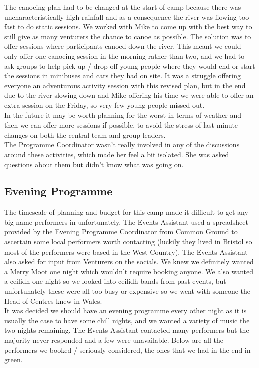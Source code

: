 The canoeing plan had to be changed at the start of camp because there was uncharacteristically high rainfall and as a consequence the river was flowing too fast to do static sessions. We worked with Mike to come up with the best way to still give as many venturers the chance to canoe as possible. The solution was to offer sessions where participants canoed down the river. This meant we could  only offer one canoeing session in the morning rather than two, and we had to ask groups to help pick up / drop off young people where they would end or start the sessions in minibuses and cars they had on site. It was a struggle offering everyone an adventurous activity session with this revised plan, but in the end due to the river slowing down and Mike offering his time we were able to offer an extra session on the Friday, so very few young people missed out.\\

In the future it may be worth planning for the worst in terms of weather and then we can offer more sessions if possible, to avoid the stress of last minute changes on both the central team and group leaders.\\

The Programme Coordinator wasn't really involved in any of the discussions around these activities, which made her feel a bit isolated. She was asked questions about them but didn't know what was going on.
\subsection{Evening Programme}
The timescale of planning and budget for this camp made it difficult to get any big name performers in unfortunately. The Events Assistant used a spreadsheet provided by the Evening Programme Coordinator from Common Ground to ascertain some local performers worth contacting (luckily they lived in Bristol so most of the performers were based in the West Country). The Events Assistant also asked for input from Venturers on the socials. We knew we definitely wanted a Merry Moot one night which wouldn't require booking anyone. We also wanted a ceilidh one night so we looked into ceilidh bands from past events, but unfortunately these were all too busy or expensive so we went with someone the Head of Centres knew in Wales.\\

It was decided we should have an evening programme every other night as it is usually the case to have some chill nights, and we wanted a variety of music the two nights remaining. The Events Assistant contacted many performers but the majority never responded and a few were unavailable. Below are all the performers we booked / seriously considered, the ones that we had in the end in green.\\

